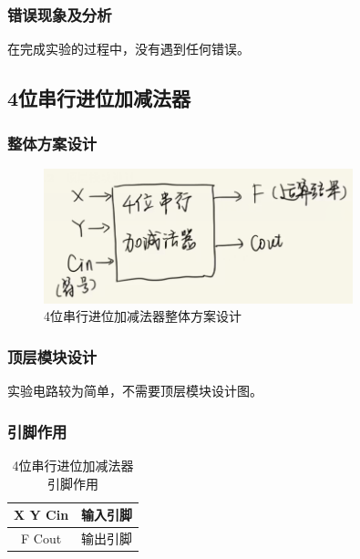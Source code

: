 \documentclass{article}
\begin{document}
    \subsubsection{错误现象及分析}
    在完成实验的过程中，没有遇到任何错误。


    \subsection{4位串行进位加减法器}

    \subsubsection{整体方案设计}
    \begin{figure}[H]
    \centering
    \includegraphics[width=0.8\textwidth]{4.1.png}
    \caption{4位串行进位加减法器整体方案设计}
    \end{figure}
    
    \subsubsection{顶层模块设计}
    实验电路较为简单，不需要顶层模块设计图。

    \subsubsection{引脚作用}
    \begin{table}[H]
    \centering
    \begin{tabular}{|c|c|}
        \hline
        X Y Cin & 输入引脚 \\ \hline
        F Cout & 输出引脚 \\ \hline
    \end{tabular}
    \caption{4位串行进位加减法器引脚作用}
    \end{table}
\end{document}

